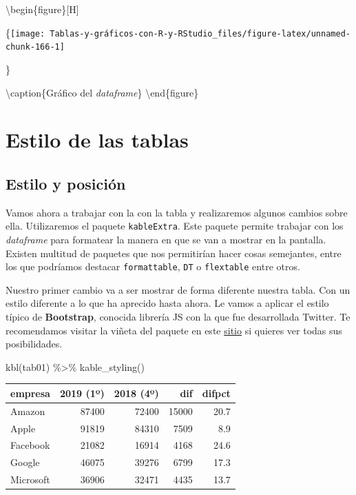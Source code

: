 \documentclass[
]{book}
\newenvironment{Shaded}{\begin{snugshade}}{\end{snugshade}}
\newcommand{\FunctionTok}[1]{\textcolor[rgb]{0.00,0.00,0.00}{#1}}
\newcommand{\NormalTok}[1]{#1}
\newcommand{\SpecialCharTok}[1]{\textcolor[rgb]{0.00,0.00,0.00}{#1}}
\begin{document}
\textbackslash begin\{figure\}{[}H{]}

\{\centering \texttt{[image: Tablas-y-gráficos-con-R-y-RStudio\_files/figure-latex/unnamed-chunk-166-1]}

\}

\textbackslash caption\{Gráfico del \emph{dataframe}\}\label{fig:unnamed-chunk-166}
\textbackslash end\{figure\}

\hypertarget{estilo-de-las-tablas}{%
\section{Estilo de las tablas}\label{estilo-de-las-tablas}}

\hypertarget{estilo-y-posiciuxf3n}{%
\subsection{Estilo y posición}\label{estilo-y-posiciuxf3n}}

Vamos ahora a trabajar con la con la tabla y realizaremos algunos cambios sobre ella. Utilizaremos el paquete \texttt{kableExtra}. Este paquete permite trabajar con los \emph{dataframe} para formatear la manera en que se van a mostrar en la pantalla. Existen multitud de paquetes que nos permitirían hacer cosas semejantes, entre los que podríamos destacar \texttt{formattable}, \texttt{DT} o \texttt{flextable} entre otros.

Nuestro primer cambio va a ser mostrar de forma diferente nuestra tabla. Con un estilo diferente a lo que ha aprecido hasta ahora. Le vamos a aplicar el estilo típico de \textbf{Bootstrap}, conocida librería JS con la que fue desarrollada Twitter. Te recomendamos visitar la viñeta del paquete en este \href{https://cran.r-project.org/web/packages/kableExtra/vignettes/awesome_table_in_html.html}{sitio} si quieres ver todas sus posibilidades.

\begin{Shaded}
\begin{Highlighting}[]
\FunctionTok{kbl}\NormalTok{(tab01) }\SpecialCharTok{\%\textgreater{}\%} \FunctionTok{kable\_styling}\NormalTok{()}
\end{Highlighting}
\end{Shaded}

\begin{table}
\centering
\begin{tabular}[t]{l|r|r|r|r}
\hline
empresa & 2019 (1º) & 2018 (4º) & dif & difpct\\
\hline
Amazon & 87400 & 72400 & 15000 & 20.7\\
\hline
Apple & 91819 & 84310 & 7509 & 8.9\\
\hline
Facebook & 21082 & 16914 & 4168 & 24.6\\
\hline
Google & 46075 & 39276 & 6799 & 17.3\\
\hline
Microsoft & 36906 & 32471 & 4435 & 13.7\\
\hline
\end{tabular}
\end{table}
\end{document}
